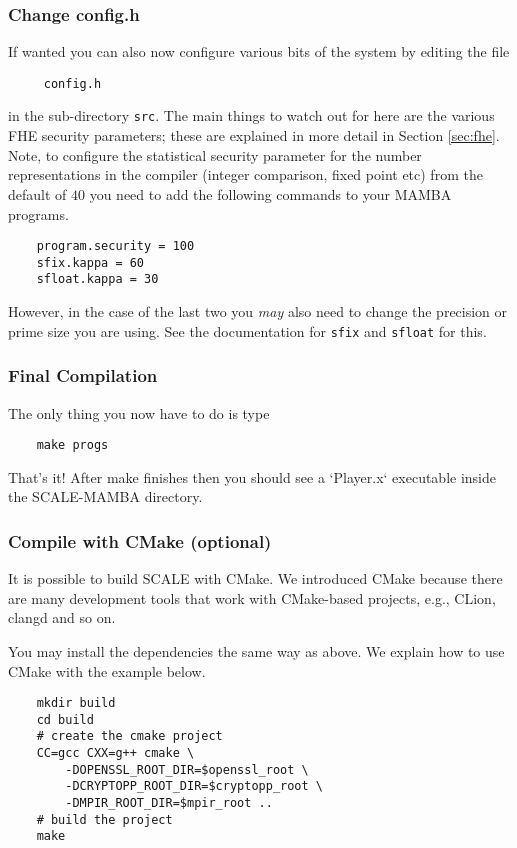 \subsubsection{Change config.h}
If wanted you can also now configure various bits of the system
by editing the file
\begin{verbatim}
     config.h
\end{verbatim}
in the sub-directory \verb+src+.
The main things to watch out for here are the various FHE security parameters;
these are explained in more detail in Section \ref{sec:fhe}.
Note, to configure the statistical security parameter for the number representations
in the compiler (integer comparison, fixed point etc) from the default
of $40$ you need to add the following commands to your MAMBA programs.
\begin{verbatim}
    program.security = 100
    sfix.kappa = 60
    sfloat.kappa = 30
\end{verbatim}
However, in the case of the last two you {\em may} also need to change the
precision or prime size you are using. See the documentation for
\verb+sfix+ and \verb+sfloat+ for this.

\subsubsection{Final Compilation}
The only thing you now have to do is type
\begin{verbatim}
    make progs
\end{verbatim}
That's it! After make finishes then you should see a `Player.x`
executable inside the SCALE-MAMBA directory.

\subsubsection{Compile with CMake (optional)}
It is possible to build SCALE with CMake.
We introduced CMake because there are many development tools that work with CMake-based projects,
e.g., CLion, clangd and so on.

You may install the dependencies the same way as above.
We explain how to use CMake with the example below.

\begin{verbatim}
    mkdir build
    cd build
    # create the cmake project
    CC=gcc CXX=g++ cmake \
        -DOPENSSL_ROOT_DIR=$openssl_root \
        -DCRYPTOPP_ROOT_DIR=$cryptopp_root \
        -DMPIR_ROOT_DIR=$mpir_root ..
    # build the project
    make
\end{verbatim}

